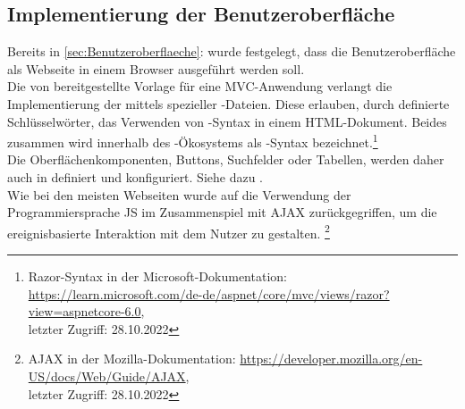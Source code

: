 \subsection{Implementierung der Benutzeroberfläche}
\label{sec:ImplementierungBenutzeroberflaeche}
Bereits in \ref{sec:Benutzeroberflaeche}:  wurde festgelegt, dass die Benutzeroberfläche
als Webseite in einem Browser ausgeführt werden soll.\\
Die von  bereitgestellte Vorlage für eine \acs{MVC}-Anwendung verlangt
die Implementierung der  mittels spezieller -Dateien.
Diese erlauben, durch definierte Schlüsselwörter, das Verwenden von -Syntax in einem
\acs{HTML}-Dokument. Beides zusammen wird innerhalb des -Ökosystems als -Syntax
bezeichnet.\footnote{Razor-Syntax in der Microsoft-Dokumentation:
\url{https://learn.microsoft.com/de-de/aspnet/core/mvc/views/razor?view=aspnetcore-6.0}, \\
letzter Zugriff: 28.10.2022}\\ 
Die Oberflächenkomponenten, \zB Buttons, Suchfelder oder Tabellen, werden daher auch in  
definiert und konfiguriert. Siehe dazu .\\
Wie bei den meisten Webseiten wurde auf die Verwendung der Programmiersprache \acs{JS} im Zusammenspiel mit \acs{AJAX} 
zurückgegriffen, um die ereignisbasierte Interaktion mit dem Nutzer zu gestalten.
\footnote{AJAX in der Mozilla-Dokumentation:
\url{https://developer.mozilla.org/en-US/docs/Web/Guide/AJAX},\\
letzter Zugriff: 28.10.2022}

